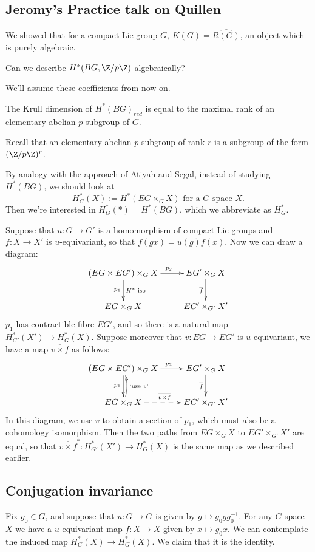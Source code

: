 \documentclass[11pt]{article}
\newcommand{\KanSemResponse}[1]
{
\thispagestyle{fancy}
\subsection*{#1}
}
\begin{document}
\begin{JeromyQuillenPractice}
\KanSemResponse
{Jeromy's Practice talk on Quillen}
We showed that for a compact Lie group $G$, $K(G)=\widehat{R(G)}$, an object which is purely algebraic.
\begin{question}
Can we describe $H^*(BG,\Z/p\Z)$ algebraically?
\end{question}
We'll assume these coefficients from now on.
\begin{conjecture}
The Krull dimension of $H^*(BG)_{red}$ is equal to the maximal rank of an elementary abelian $p$-subgroup of $G$.
\end{conjecture}
\noindent Recall that an elementary abelian $p$-subgroup of rank $r$ is a subgroup of the form $(\Z/p\Z)^r$.

By analogy with the approach of Atiyah and Segal, instead of studying $H^*(BG)$, we should look at 
\[H^*_G(X):=H^*(EG\times_G X)\text{ for a $G$-space $X$}.\]
Then we're interested in $H^*_G(\ast)=H^*(BG)$, which we abbreviate as $H_G^*$.

Suppose that $u:G\to G'$ is a homomorphism of compact Lie groups and $f:X\to X'$ is $u$-equivariant, so that $f(gx)=u(g)f(x)$. Now we can draw a diagram:
\[\xymatrix{
(EG\times EG')\times_G X\ar[r]^{\ \ \ p_2}\ar[d]_{p_1}^{\text{$H^*$-iso}}&EG'\times_GX\ar[d]_{\overline f}\\
EG\times_G X&EG'\times_{G'}X'
}\]
$p_1$ has contractible fibre $EG'$, and so there is a natural map $H^*_{G'}(X')\to H^*_{G}(X)$. Suppose moreover that $v:EG\to EG'$ is $u$-equivariant, we have a map ${\overline{v\times f}}$ as follows:
\[\xymatrix{
(EG\times EG')\times_G X\ar[r]^{\ \ \ p_2}\ar[d]_{p_1}&EG'\times_GX\ar[d]_{\overline f}\\
\ar@/_1ex/[u]_{\text{`use $v$'}}\ar@{-->}[r]^{\overline{v\times f}}EG\times_G X&EG'\times_{G'}X'
}\]
In this diagram, we use $v$ to obtain a section of $p_1$, which must also be a cohomology isomorphism. Then the two paths from $EG\times_G X$ to $EG'\times_{G'}X'$ are equal, so that $\overline{v\times f}^*:H^*_{G'}(X')\to H^*_{G}(X)$ is the same map as we described earlier.
\subsection*{Conjugation invariance}
Fix $g_0\in G$, and suppose that $u:G\to G$ is given by $g\mapsto g_0gg_0^{-1}$. For any $G$-space $X$ we have a $u$-equivariant map $f:X\to X$ given by $x\mapsto g_0x$. We can contemplate the induced map $H^*_G(X)\to H^*_G(X)$. We claim that it is the identity.


\end{JeromyQuillenPractice}
\end{document}
